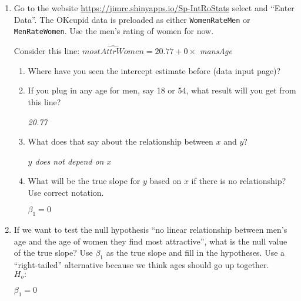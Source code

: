 \begin{enumerate}
\item Go to the website
  \url{https://jimrc.shinyapps.io/Sp-IntRoStats}
  select  and ``Enter Data''. The OKcupid data is
  preloaded as either {\tt WomenRateMen} or {\tt MenRateWomen}. Use
  the men's rating of women for now.

Consider this line:
  {\it  $\widehat{mostAttrWomen} = 20.77 + 0 \times $ mansAge   }


    \begin{enumerate} 
    \item Where have you seen the intercept estimate before (data
      input page)?

      \item If you plug in any age for men, say 18 or 54, what result
        will you get from this line?
\begin{students}
 \vspace{1.cm}      
\end{students}

\begin{key}
  {\it   20.77    }
\end{key}
      \item What does that say about the relationship between $x$ and
        $y$?
\begin{students}
 \vspace{1.cm}      
\end{students}

\begin{key}
  {\it  $y$ does not depend on $x$  }
\end{key}

      \item What will be the true slope for $y$ based on $x$ if there
        is no relationship?  Use    correct notation.
\begin{students}
 \vspace{1cm}      
\end{students}

\begin{key}
  {\it  $\beta_1=0$   }
\end{key}
      \end{enumerate}
      

\item  If we  want to test the null hypothesis ``no linear
  relationship between men's age and the age of women they find most
  attractive'', what is the null value of the true slope?  Use $\beta_1$ as the
  true slope and fill in the hypotheses.  Use a ``right-tailed''
  alternative because we think ages should go up together.\\
  $H_o:$
\begin{students}
 \vspace{1cm}      
\end{students}
\begin{key}
  {\it  $\beta_1 = 0$   }
\end{key}


\end{enumerate}
